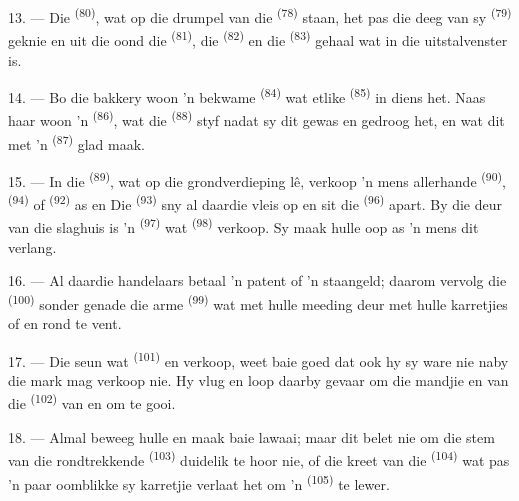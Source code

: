 13. --- Die  \textsuperscript{(80)}, wat op die drumpel van die
 \textsuperscript{(78)} staan, het pas die deeg van sy 
\textsuperscript{(79)} geknie en uit die oond die 
\textsuperscript{(81)}, die  \textsuperscript{(82)} en die
 \textsuperscript{(83)} gehaal wat in die uitstalvenster is.

14. --- Bo die bakkery woon 'n bekwame  \textsuperscript{(84)} wat
etlike  \textsuperscript{(85)} in diens het. Naas haar woon 'n
 \textsuperscript{(86)}, wat die 
\textsuperscript{(88)} styf nadat sy dit gewas en gedroog het, en wat dit met 'n
 \textsuperscript{(87)} glad maak.

\VUsaut{4.0mm}
\VUsaut{3.0mm}

15. --- In die  \textsuperscript{(89)}, wat op die grondverdieping lê,
verkoop 'n mens allerhande  \textsuperscript{(90)},
 \textsuperscript{(94)} of  \textsuperscript{(92)}
as  en  Die
 \textsuperscript{(93)} sny al daardie vleis op en sit die
 \textsuperscript{(96)} apart. By die deur van die slaghuis is 'n
 \textsuperscript{(97)} wat 
\textsuperscript{(98)} verkoop. Sy maak hulle oop as 'n mens dit verlang.

16. --- Al daardie handelaars betaal 'n patent of 'n staangeld; daarom vervolg die
 \textsuperscript{(100)} sonder genade die arme
 \textsuperscript{(99)} wat met hulle meeding deur met hulle
karretjies  of  en  rond te vent.

\VUsaut{4.0mm}
\VUsaut{3.0mm}

17. --- Die seun wat  \textsuperscript{(101)} en  verkoop,
weet baie goed dat ook hy sy ware nie naby die mark mag verkoop nie. Hy vlug en loop
daarby gevaar om die mandjie   en
 van die  \textsuperscript{(102)} van
 en  om te gooi.

18. --- Almal beweeg hulle en maak baie lawaai; maar dit belet nie om die stem van die
rondtrekkende  \textsuperscript{(103)} duidelik te hoor nie, of die
kreet van die  \textsuperscript{(104)} wat pas 'n paar oomblikke sy
karretjie verlaat het om 'n  \textsuperscript{(105)} te lewer.
\VUsaut{6.0mm}
\VUfilet{22mm}
